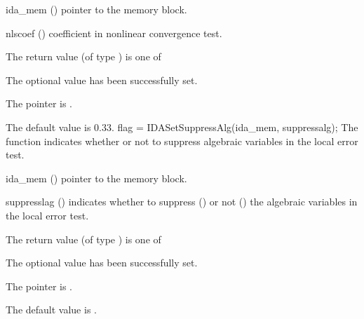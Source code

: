 {{\begin{args}
  \item[ida\_mem] ()
    pointer to the {\ida} memory block.
  \item[nlscoef] ()
    coefficient in nonlinear convergence test.
  \end{args}
}
{
  The return value  (of type ) is one of
  \begin{args}
  \item[\Id{IDA\_SUCCESS}] 
    The optional value has been successfully set.
  \item[\Id{IDA\_MEM\_NULL}]
    The  pointer is .
  \end{args}
}
{
  The default value is $0.33$.
}
{
flag = IDASetSuppressAlg(ida\_mem, suppressalg);
}
{
  The function  indicates whether or not to
  suppress algebraic variables in the local error test.
}
{
  \begin{args}[suppressalg]
  \item[ida\_mem] ()
    pointer to the {\ida} memory block.
  \item[suppresslag] ()
    indicates whether to suppress () or not
    () the algebraic variables in the local error test.
  \end{args}
}
{
  The return value  (of type ) is one of
  \begin{args}
  \item[\Id{IDA\_SUCCESS}] 
    The optional value has been successfully set.
  \item[\Id{IDA\_MEM\_NULL}]
    The  pointer is .
  \end{args}
}
{
  The default value is .

}}
